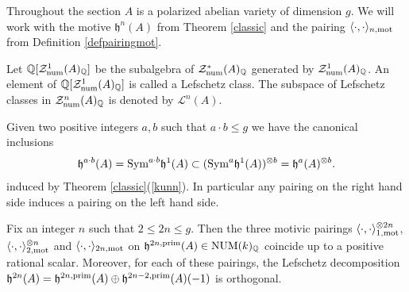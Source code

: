 \documentclass[11pt]{amsart}
\begin{document}
Throughout the section $A$ is a polarized abelian variety of dimension $g$. We will work with the motive $\mathfrak{h}^{n}(A)$ from Theorem \ref{classic} and the pairing  $\langle \cdot, \cdot \rangle_{n,\mathrm{mot}} $   from Definition \ref{defpairingmot}. 
\begin{definition}\label{defexotic} Let  $\mathbb{Q}[\mathcal{Z}^{1}_{\mathrm{num}}(A)_{\mathbb{Q}}]$ be the subalgebra of $\mathcal{Z}^{*}_{\mathrm{num}}(A)_{\mathbb{Q}}$ generated by $\mathcal{Z}^{1}_{\mathrm{num}}(A)_{\mathbb{Q}}$.  An element of $\mathbb{Q}[\mathcal{Z}^{1}_{\mathrm{num}}(A)_{\mathbb{Q}}]$ is called a  Lefschetz class. The subspace  of Lefschetz classes in $\mathcal{Z}^{n}_{\mathrm{num}}(A)_{\mathbb{Q}}$ is denoted by  $\mathcal{L}^{n}(A)$.
\end{definition}
\begin{remark}\label{nonsisa}
Given two positive integers $a,b$ such that $a\cdot b \leq g$ we have the canonical inclusions
\begin{equation} \label{eq:nonsisa}
\mathfrak{h}^{a\cdot b}(A)=\textnormal{Sym}^{a \cdot b} \mathfrak{h}^1(A) \subset (\textnormal{Sym}^{a} \mathfrak{h}^1(A))^{\otimes b}  = \mathfrak{h}^a(A)^{\otimes b}.
\end{equation}
  induced by Theorem \ref{classic}(\ref{kunn}). In particular any pairing on the right hand side induces a pairing on the left hand side. \end{remark}
\begin{lemma}\label{accoppiamenti1}
Fix an integer $n$ such that   $ 2 \leq 2n\leq g.$ Then the three motivic pairings $\langle \cdot, \cdot \rangle_{1,\mathrm{mot}}^{\otimes 2n}$,  $\langle \cdot, \cdot \rangle_{2,\mathrm{mot}}^{\otimes n}$ and $\langle \cdot, \cdot \rangle_{2n,\mathrm{mot}}$ on $\mathfrak{h}^{2n,\mathrm{prim}}(A)\in \mathrm{NUM}(k)_{\mathbb{Q}}$ coincide up to a positive rational scalar. Moreover, for each of these pairings, the Lefschetz decomposition $\mathfrak{h}^{2n}(A) = \mathfrak{h}^{2n,\mathrm{prim}}(A) \oplus \mathfrak{h}^{2n-2,\mathrm{prim}}(A) (-1)$ is orthogonal.\end{lemma}
\end{document}
